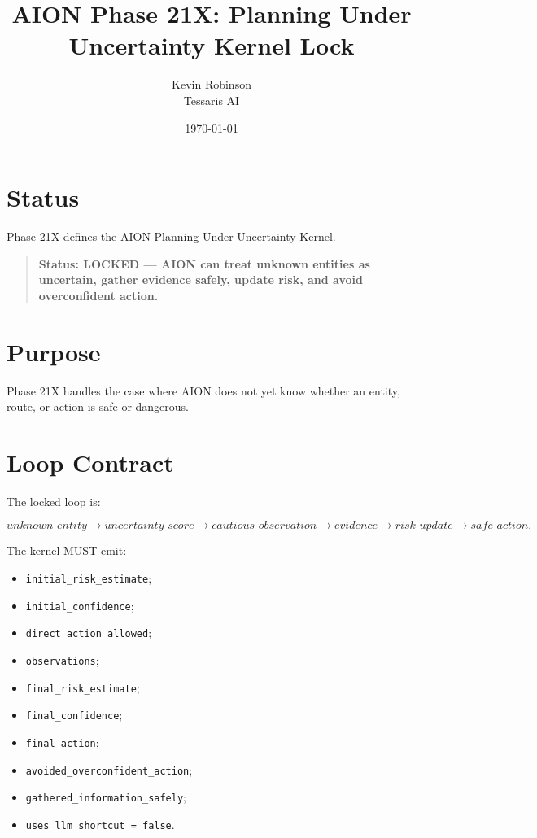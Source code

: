\documentclass[11pt,a4paper]{article}
\title{\textbf{AION Phase 21X: Planning Under Uncertainty Kernel Lock}}
\author{Kevin Robinson\\Tessaris AI}
\date{\today}
\begin{document}
\maketitle

\section{Status}

Phase 21X defines the AION Planning Under Uncertainty Kernel.

\begin{quote}
\textbf{Status: LOCKED --- AION can treat unknown entities as uncertain, gather evidence safely, update risk, and avoid overconfident action.}
\end{quote}

\section{Purpose}

Phase 21X handles the case where AION does not yet know whether an entity, route, or action is safe or dangerous.

\section{Loop Contract}

The locked loop is:

\[
unknown\_entity
\rightarrow uncertainty\_score
\rightarrow cautious\_observation
\rightarrow evidence
\rightarrow risk\_update
\rightarrow safe\_action.
\]

The kernel MUST emit:

\begin{itemize}
  \item \texttt{initial\_risk\_estimate};
  \item \texttt{initial\_confidence};
  \item \texttt{direct\_action\_allowed};
  \item \texttt{observations};
  \item \texttt{final\_risk\_estimate};
  \item \texttt{final\_confidence};
  \item \texttt{final\_action};
  \item \texttt{avoided\_overconfident\_action};
  \item \texttt{gathered\_information\_safely};
  \item \texttt{uses\_llm\_shortcut = false}.
\end{itemize}
\end{document}
